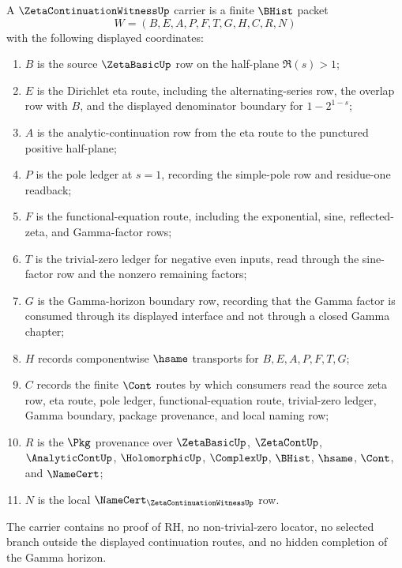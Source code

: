\begin{definition}
\label{def:zeta-continuation-witness-carrier}
A $\ZetaContinuationWitnessUp$ carrier is a finite $\BHist$ packet
$$
W=(B,E,A,P,F,T,G,H,C,R,N)
$$
with the following displayed coordinates:
\begin{enumerate}
\item $B$ is the source $\ZetaBasicUp$ row on the half-plane $\Re(s)>1$;
\item $E$ is the Dirichlet eta route, including the alternating-series row, the overlap row with $B$, and the displayed denominator boundary for $1-2^{1-s}$;
\item $A$ is the analytic-continuation row from the eta route to the punctured positive half-plane;
\item $P$ is the pole ledger at $s=1$, recording the simple-pole row and residue-one readback;
\item $F$ is the functional-equation route, including the exponential, sine, reflected-zeta, and Gamma-factor rows;
\item $T$ is the trivial-zero ledger for negative even inputs, read through the sine-factor row and the nonzero remaining factors;
\item $G$ is the Gamma-horizon boundary row, recording that the Gamma factor is consumed through its displayed interface and not through a closed Gamma chapter;
\item $H$ records componentwise $\hsame$ transports for $B,E,A,P,F,T,G$;
\item $C$ records the finite $\Cont$ routes by which consumers read the source zeta row, eta route, pole ledger, functional-equation route, trivial-zero ledger, Gamma boundary, package provenance, and local naming row;
\item $R$ is the $\Pkg$ provenance over $\ZetaBasicUp$, $\ZetaContUp$, $\AnalyticContUp$, $\HolomorphicUp$, $\ComplexUp$, $\BHist$, $\hsame$, $\Cont$, and $\NameCert$;
\item $N$ is the local $\NameCert_{\ZetaContinuationWitnessUp}$ row.
\end{enumerate}
The carrier contains no proof of RH, no non-trivial-zero locator, no selected branch outside the displayed continuation routes, and no hidden completion of the Gamma horizon.
\end{definition}


